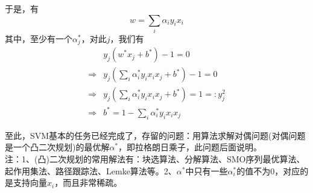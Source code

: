 		于是，有
		\[
		w = \sum_{i} \alpha_i y_i x_i
		\]
		其中，至少有一个$\alpha_j^*$，对此$j$，我们有
		\begin{align*}
		& y_j(w^* x_j + b^*) -1 = 0 \\
		\Rightarrow {} & y_j(\sum_{i}\alpha_i^* y_i x_i x_j + b^*) - 1 = 0 \\
		\Rightarrow {} & y_j(\sum_{i}\alpha_i^* y_i x_i x_j + b^*) = 1 =: y_j^2 \\
		\Rightarrow {} & b^* = 1 - \sum_{i}\alpha_i^* y_i x_i x_j
		\end{align*}

		\par
		至此，SVM基本的任务已经完成了，存留的问题：用算法求解对偶问题(对偶问题是一个凸二次规划)的最优解$\alpha^*$，即拉格朗日乘子，此问题后面说明。\\
		注：1、(凸)二次规划的常用解法有：块选算法、分解算法、SMO序列最优算法、起作用集法、路径跟踪法、Lemke算法等。2、$\alpha^*$中只有一些$\alpha_i^*$的值不为0，对应的是支持向量$x_i$，而且非常稀疏。

